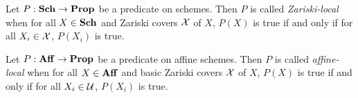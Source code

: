 \documentclass[../main.tex]{subfiles}
\begin{document}
\begin{dfn}
  
  Let $P : \mathbf{Sch} \to \mathbf{Prop}$ be a predicate on schemes.
  Then $P$ is called \emph{Zariski-local} when 
  for all $X \in \mathbf{Sch}$ and Zariski covers $\mathcal{X}$ of $X$,
  $P(X)$ is true if and only if 
  for all $X_i \in \mathcal{X}$, $P(X_i)$ is true. 
\end{dfn}

\begin{dfn}
  
  Let $P : \mathbf{Aff} \to \mathbf{Prop}$ be a predicate on affine schemes. 
  Then $P$ is called \emph{affine-local} when 
  for all $X \in \mathbf{Aff}$ and basic Zariski covers $\mathcal{X}$ of $X$,
  $P(X)$ is true if and only if 
  for all $X_i \in \mathcal{U}$, $P(X_i)$ is true.
\end{dfn}
\end{document}
